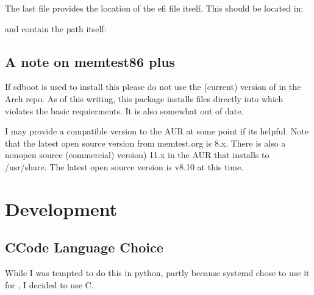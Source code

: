 \documentclass[letterpaper,11pt,english]{sphinxmanual}
\begin{document}
\sphinxAtStartPar
The last file provides the location of the efi file itself. This should be located in:

\begin{sphinxVerbatim}[commandchars=\\\{\}]
\end{sphinxVerbatim}

\sphinxAtStartPar
and contain the path itself:

\begin{sphinxVerbatim}[commandchars=\\\{\}]
\end{sphinxVerbatim}


\section{A note on memtest86 plus}
\label{\detokenize{Efi-Tools:a-note-on-memtest86-plus}}
\sphinxAtStartPar
If sd\sphinxhyphen{}boot is used to install this please do not use the (current)
version of  in the Arch repo. As of this writing, this package installs
files directly into  which violates the basic requierments.
It is also somewhat out of date.

\sphinxAtStartPar
I may provide a compatible version to the AUR at some point if its helpful.
Note that the latest open source version from memtest.org is 8.x. There is
also a non\sphinxhyphen{}open source (commercial) version) 11.x in the AUR that installs to /usr/share.
The latest open source version is v8.10 at this time.

\sphinxstepscope


\chapter{Development}
\label{\detokenize{Development:development}}\label{\detokenize{Development::doc}}

\section{C\sphinxhyphen{}Code Language Choice}
\label{\detokenize{Development:c-code-language-choice}}
\sphinxAtStartPar
While I was tempted to do this in python, partly because systemd chose to use it for
, I decided to use C.
\end{document}
